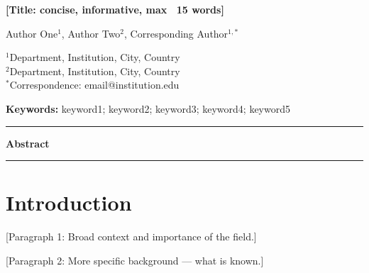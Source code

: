 \documentclass[9pt,twoside,lineno]{article}
\begin{document}
\begin{center}
  {\LARGE\bfseries [Title: concise, informative, max ~15 words]}

  \vspace{1em}

  Author One$^{1}$, Author Two$^{2}$, Corresponding Author$^{1,*}$

  \vspace{0.5em}

  \footnotesize
  $^{1}$Department, Institution, City, Country \\
  $^{2}$Department, Institution, City, Country \\
  $^{*}$Correspondence: email@institution.edu

  \vspace{0.5em}
  \normalsize
  \textbf{Keywords:} keyword1; keyword2; keyword3; keyword4; keyword5
\end{center}

\hrule
\vspace{1em}

\noindent\textbf{Abstract}


\vspace{1em}
\hrule
\vspace{1em}

\section*{Introduction}

[Paragraph 1: Broad context and importance of the field.]

[Paragraph 2: More specific background — what is known.]
\end{document}
